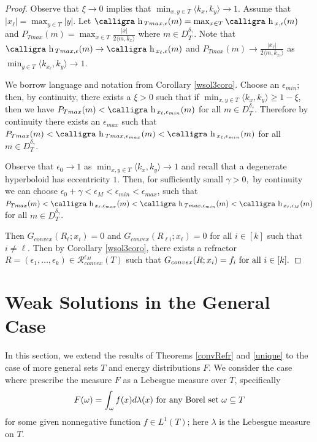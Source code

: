 \documentclass[review]{elsarticle}
\newcommand{\h}{\text{\calligra h}\,}
\begin{document}
\begin{proof}
Observe that $\xi\to 0$ implies that $\min_{x,y\in T}\langle k_x,k_y\rangle\to 1$. Assume that $|x_\ell|=\max_{y\in T}|y|$. Let $\h_{ Tmax,\epsilon}(m)=\max_{x\in T}\h_{x,\epsilon}(m)$ and $P_{Tmax}(m)=\max_{x\in T}\frac{|x|}{2\langle m,k_{x}\rangle}$ where $m\in D_T^{\delta_\gamma}.$ Note that $\h_{ Tmax,\epsilon}(m)\to \h_{x_\ell,\epsilon}(m)$ and $P_{ Tmax}(m)\to \frac{|x_\ell|}{2\langle m,k_{x_\ell}\rangle}$ as $\min_{y\in T}\langle k_{x_\ell},k_y\rangle\to 1$.

We borrow language and notation from Corollary \ref{wsol3coro}. Choose an $\epsilon_{min}$; then, by continuity, there exists a $\xi>0$ such that if $\min_{x,y\in T}\langle k_x,k_y\rangle\ge1-\xi$, then we have $P_{Tmax}(m)<\h_{x_\ell,\epsilon_{min}}(m)$ for all $m\in D_T^{\delta_\gamma}.$ Therefore by continuity there exists an $\epsilon_{max}$ such that $P_{T max}(m) < \h_{T max,\epsilon_{max}}(m) < \h_{x_\ell,\epsilon_{min} }(m)$ for all $m \in D_T^{\delta_\gamma}.$

Observe that  $\epsilon_0\to 1$ as $\min_{x,y\in T}\langle k_x,k_y\rangle\to 1$ and recall that a degenerate hyperboloid has eccentricity $1.$ Then, for sufficiently small $\gamma>0,$ by continuity we can choose $\epsilon_0+\gamma<\epsilon_M<\epsilon_{min}<\epsilon_{max}$, such that $P_{Tmax}(m)<\h_{x_\ell,\epsilon_{max}}(m)<\h_{Tmax,\epsilon_{min}}(m)<\h_{x_\ell,\epsilon_{M}}(m)$ for all $m\in D_T^{\delta_\gamma}$. 

Then $G_{convex}(R_\ell;x_i)=0$ and $G_{convex}(R_{\ell i};x_\ell)=0$ for all $i\in[k]$ such that $i\neq \ell$. Then by Corollary \ref{wsol3coro}, there exists a refractor $R = (\epsilon_1,\dots,\epsilon_k) \in \mathcal{R}_{convex}^{\epsilon_M} (T)$ such that $G_{convex}(R; x_i) = f_i \textnormal{ for all } i \in[k].$

\end{proof}


\section{Weak Solutions in the General Case}
In this section, we extend the results of Theorems \ref{convRefr} and \ref{unique} to the case of more general sets $T$ and
energy distributions $F$. We consider the case where prescribe the measure $F$ as a Lebesgue measure over $T$, specifically
\begin{equation}\label{lebesgue}
    F(\omega)=\int_\omega f(x)d\lambda(x)\textnormal{ for any Borel set }\omega\subseteq T
\end{equation}
for some given nonnegative function $f \in L^1(T )$; here $\lambda$ is the Lebesgue measure on $T$. 
\end{document}
